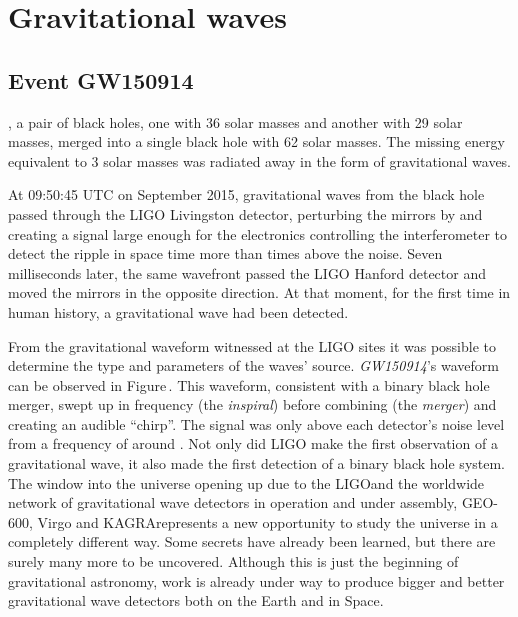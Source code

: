 \chapter{\label{c:gw-detection}Gravitational waves}


\section{Event GW150914}
, a pair of black holes, one with 36 solar masses and another with 29 solar masses, merged into a single black hole with 62 solar masses. The missing energy equivalent to 3 solar masses was radiated away in the form of gravitational waves.

At 09:50:45 \gls{UTC} on  September 2015, gravitational waves from the black hole passed through the LIGO Livingston detector, perturbing the mirrors by  and creating a signal large enough for the electronics controlling the interferometer to detect the ripple in space time more than  times above the noise. Seven milliseconds later, the same wavefront passed the LIGO Hanford detector and moved the mirrors in the opposite direction. At that moment, for the first time in human history, a gravitational wave had been detected.

From the gravitational waveform witnessed at the LIGO sites it was possible to determine the type and parameters of the waves' source. \emph{GW150914}'s waveform can be observed in Figure\,. This waveform, consistent with a binary black hole merger, swept up in frequency (the \emph{inspiral}) before combining (the \emph{merger}) and creating an audible ``chirp''. The signal was only above each detector's noise level from a frequency of around . Not only did LIGO make the first observation of a gravitational wave, it also made the first detection of a binary black hole system. The window into the universe opening up due to the LIGO\textemdash and the worldwide network of gravitational wave detectors in operation and under assembly, GEO-600, Virgo and KAGRA\textemdash represents a new opportunity to study the universe in a completely different way. Some secrets have already been learned, but there are surely many more to be uncovered. Although this is just the beginning of gravitational astronomy, work is already under way to produce bigger and better gravitational wave detectors both on the Earth and in Space.

